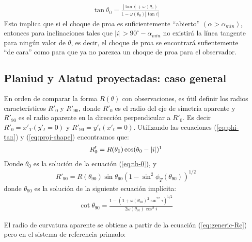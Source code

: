 \begin{align}
  \tan\theta_0 = \frac{|\tan i| + \omega(\theta_0)}{1 - \omega(\theta_0)|\tan i|}
  \label{eq:th-0}
\end{align}
Esto implica que si el choque de proa es suficientemente ``abierto'' $(\alpha > \alpha_{min})$, entonces para inclinaciones tales que
$|i| > 90^\circ - \alpha_{min}$ no existirá la línea tangente para ningún valor de $\theta$, es decir, el choque de proa se encontrará sufientemente ``de cara'' como para que ya no parezca un choque de proa para el observador.

\subsection{Planiud y Alatud proyectadas: caso general}

En orden de comparar la forma $R(\theta)$ con observaciones, es útil definir los radios característicos $R'_0$ y $R'_{90}$, donde $R'_0$ es el radio del eje de simetría aparente y $R'_{90}$ es el radio aparente en la dirección perpendicular a $R'_0$. Es decir
$R'_0 = x'_T(y'_t=0)$ y $R'_{90} = y'_t(x'_t = 0)$. Utilizando las ecuaciones (\ref{eq:phi-tan}) y (\ref{eq:proj-shape}) encontramos que:
\begin{align}
R'_0 = R(\theta_0)\cos(\theta_0 - |i|)\footnotemark
\label{eq:R0p}
\end{align}
Donde $\theta_0$ es la solución de la ecuación (\ref{eq:th-0}), y
\begin{align}
  R'_{90} = R(\theta_{90})\sin\theta_{90}\left(1-\sin^2\phi_T(\theta_{90})\right)^{1/2}
  \label{eq:R90p}
\end{align}
donde $\theta_{90}$ es la solución de la siguiente ecuación implícita:
\begin{align}
  \cot\theta_{90} = \frac{1 - \left(1+\omega(\theta_{90})^2\sin^22i\right)^{1/2}}
  {2\omega(\theta_{90})\cos^2i}
  \label{eq:th90}
\end{align}

El radio de curvatura aparente se obtiene a partir de la ecuación (\ref{eq:generic-Rc}) pero en el sistema de referencia primado:

